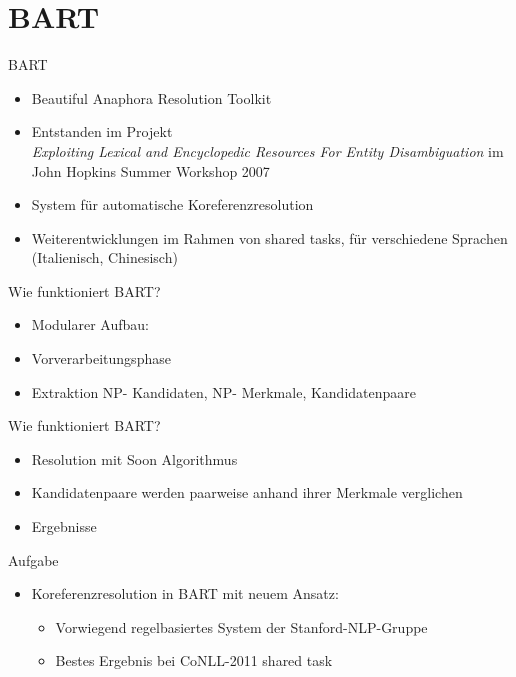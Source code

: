 \documentclass[11pt,a4paper]{beamer}
\begin{document}
\section{BART}
\begin{frame}{BART}
\begin{itemize}
\item Beautiful Anaphora Resolution Toolkit
\item Entstanden im Projekt\\ \textit{Exploiting Lexical and Encyclopedic Resources For Entity Disambiguation} 
im John Hopkins Summer Workshop 2007
\item System für automatische Koreferenzresolution
\item Weiterentwicklungen im Rahmen von shared tasks, für verschiedene Sprachen (Italienisch, Chinesisch)
\end{itemize}
\end{frame}

\begin{frame}{Wie funktioniert BART?}
\begin{itemize}
\item Modularer Aufbau: 
\item Vorverarbeitungsphase
\item Extraktion NP- Kandidaten, NP- Merkmale, Kandidatenpaare
\end{itemize}
\end{frame}

\begin{frame}{Wie funktioniert BART?}
\begin{itemize}
\item Resolution mit Soon Algorithmus 
\item Kandidatenpaare werden paarweise anhand ihrer Merkmale verglichen
\item Ergebnisse
\end{itemize}
\end{frame}

\begin{frame}{Aufgabe}
\begin{itemize}
\item Koreferenzresolution in BART mit neuem Ansatz: 
\begin{itemize}
\item Vorwiegend regelbasiertes System der Stanford-NLP-Gruppe
\item Bestes Ergebnis bei CoNLL-2011 shared task
\end{itemize}
\end{itemize}
\end{frame}
\end{document}
